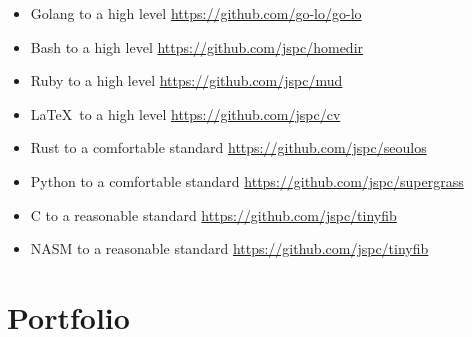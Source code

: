 \documentclass[11pt,a4paper,sans]{article}
\begin{document}
\begin{itemize}
\item Golang to a high level \href{https://github.com/go-lo/go-lo}{https://github.com/go-lo/go-lo}
\item Bash to a high level \href{https://github.com/jspc/homedir}{https://github.com/jspc/homedir}
\item Ruby to a high level \href{https://github.com/jspc/mud}{https://github.com/jspc/mud}
\item \LaTeX \ to a high level \href{https://github.com/jspc/cv}{https://github.com/jspc/cv}
\item Rust to a comfortable standard \href{https://github.com/jspc/seoulos}{https://github.com/jspc/seoulos}
\item Python to a comfortable standard \href{https://github.com/jspc/supergrass}{https://github.com/jspc/supergrass}
\item C to a reasonable standard \href{https://github.com/jspc/tinyfib}{https://github.com/jspc/tinyfib}
\item NASM to a reasonable standard \href{https://github.com/jspc/tinyfib}{https://github.com/jspc/tinyfib}
\end{itemize}

\section{Portfolio}
\end{document}

